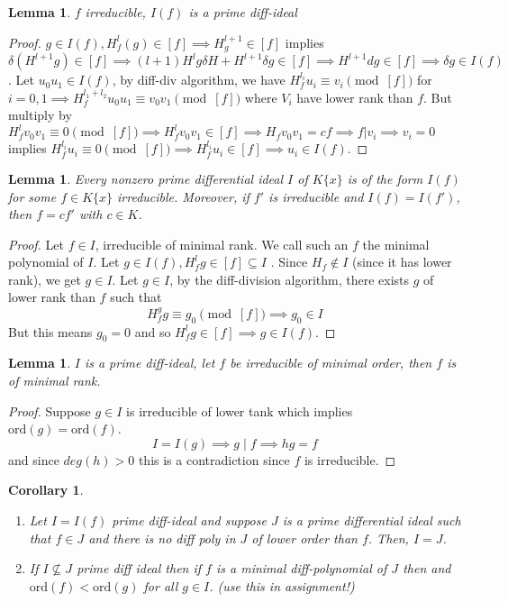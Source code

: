 \documentclass[letterpaper, 12pt]{article}
\newcommand{\ord}{\mbox{ord}}
\theoremstyle{stdthm}
\newtheorem{lem}[thm]{Lemma}
\newtheorem{cor}[thm]{Corollary}
\theoremstyle{stddef}
\theoremstyle{stdnonum}
\theoremstyle{stdqands}
\theoremstyle{stdbold}
\begin{document}
\begin{lem}
$f$ irreducible, $I(f)$ is a prime diff-ideal 
\end{lem}
\begin{proof}
$g \in I(f), H_f^l (g) \in [f] \implies H_g^{l+1} \in [f]$ implies $\delta(H^{l+1} g) \in [f] \implies (l+1) H^lg\delta H + H^{l+1} \delta g \in [f] \implies H^{l+1} dg \in [f] \implies \delta g \in I(f)$. Let $u_0 u_1 \in I(f)$, by diff-div algorithm, we have $H_f^{l_i} u_i \equiv v_i \pmod [f]$ for $i = 0,1 \implies H_f^{l_1 + l_2} u_0 u_1 \equiv v_0 v_1 \pmod [f]$ where $V_i$ have lower rank than $f$. But multiply by $H_f^l v_0 v_1 \equiv 0 \pmod[f] \implies H_f^l v_0 v_1 \in [f] \implies H_fv_0v_1 = cf \implies f|v_i \implies v_i = 0$  implies $H_f^{l_i} u_i \equiv 0  \pmod[f] \implies H_f^{l_i} u_i \in [f] \implies u_i \in I(f)$. 
\end{proof}

\begin{lem}
Every nonzero prime differential ideal $I$ of $K\{x\}$ is of the form $I(f)$ for some $f \in K\{x\}$ irreducible. Moreover, if $f'$ is irreducible and $I(f) = I(f')$, then $f = cf'$ with $c \in K$.  
\end{lem}

\begin{proof}
Let $f \in I$, irreducible of minimal rank. We call such an $f$ the minimal polynomial of $I$. Let $g \in I(f), H_f^l g \in [f] \subseteq I$ . Since $H_f \notin I$ (since it has lower rank), we get $g \in I$. Let $g \in I$, by the diff-division algorithm, there exists $g$ of lower rank than $f$ such that 
\[ H_f^g g \equiv g_0 \pmod{[f]}  \implies g_0 \in I \] 
But this means $g_0 = 0$ and so $H_f^l g \in [f] \implies g \in I(f)$. 

\end{proof}

\begin{lem}
$I$ is a prime diff-ideal, let $f$ be irreducible of minimal order, then $f$ is of minimal rank. 
\end{lem}

\begin{proof}

Suppose $g \in I$ is irreducible of lower tank which implies $\ord(g) = \ord(f)$. 
\[ I = I(g) \implies g \mid f \implies hg = f \]
and since $deg(h) > 0$ this is a contradiction since $f$ is irreducible. 

\end{proof}

\begin{cor}
\begin{enumerate}
\item Let $I = I(f)$ prime diff-ideal and suppose $J$ is a prime differential ideal such that $f \in J$ and there is no diff poly in $J$ of lower order than $f$. Then, $I = J$. 
\item If $I \nsubseteq J$ prime diff ideal then if $f$ is a minimal diff-polynomial of $J$ then and $\ord(f) < \ord(g)$ for all $g \in I$. (use this in assignment!)
\end{enumerate}
\end{cor}
\end{document}
